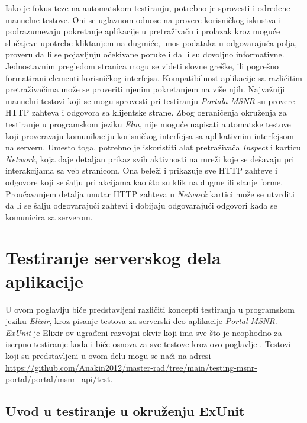 \documentclass[12pt,oneside]{memoir}
\begin{document}
\par Iako je fokus teze na automatskom testiranju, potrebno je sprovesti i određene manuelne testove. Oni se uglavnom odnose na provere korisničkog iskustva i podrazumevaju pokretanje aplikacije u pretraživaču i prolazak kroz moguće slučajeve upotrebe kliktanjem na dugmiće, unos podataka u odgovarajuća polja, proveru da li se pojavljuju očekivane poruke i da li su dovoljno informativne. Jednostavnim pregledom stranica mogu se videti slovne greške, ili pogrešno formatirani elementi korisničkog interfejsa. Kompatibilnost aplikacije sa različitim pretraživačima može se proveriti njenim pokretanjem na više njih. Najvažniji manuelni testovi koji se mogu sprovesti pri testiranju \emph{Portala MSNR} su provere HTTP zahteva i odgovora sa klijentske strane. Zbog ograničenja okruženja za testiranje u programskom jeziku \emph{Elm}, nije moguće napisati automatske testove koji proveravaju komunikaciju korisničkog interfejsa sa aplikativnim interfejsom na serveru. Umesto toga, potrebno je iskoristiti alat pretraživača \emph{Inspect} i karticu \emph{Network}, koja daje detaljan prikaz svih aktivnosti na mreži koje se dešavaju pri interakcijama sa veb stranicom. Ona beleži i prikazuje sve HTTP zahteve i odgovore koji se šalju pri akcijama kao što su klik na dugme ili slanje forme. Proučavanjem detalja unutar HTTP zahteva u \emph{Network} kartici može se utvrditi da li se šalju odgovarajući zahtevi i dobijaju odgovarajući odgovori kada se komunicira sa serverom.

\chapter{Testiranje serverskog dela aplikacije}
\label{chp:elixir}

\par U ovom poglavlju biće predstavljeni različiti koncepti testiranja u programskom jeziku \emph{Elixir}, kroz pisanje testova za serverski deo aplikacije \emph{Portal MSNR}. \textit{ExUnit} je Elixir-ov ugrađeni razvojni okvir koji ima sve što je neophodno za iscrpno testiranje koda i biće osnova za sve testove kroz ovo poglavlje \cite{exunit}. Testovi koji su predstavljeni u ovom delu mogu se naći na adresi \url{https://github.com/Anakin2012/master-rad/tree/main/testing-msnr-portal/portal/msnr_api/test}.

\section{Uvod u testiranje u okruženju ExUnit}
\label{sec:elixunit}
\end{document}
